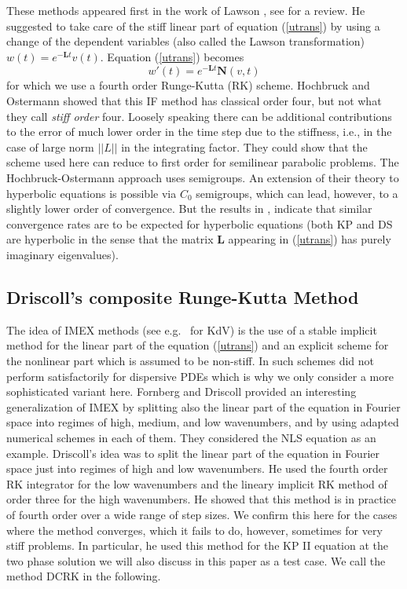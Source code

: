 \documentclass[final]{siamltex}
\begin{document}
These methods appeared first in the work of Lawson 
\cite{law}, see \cite{MW} for a review.
He suggested to take care of the stiff linear part of 
equation (\ref{utrans}) by
using a change of the dependent variables (also called the Lawson transformation)
$w(t)=e^{-\mathbf{L}t}v(t)$.
Equation (\ref{utrans}) becomes
\begin{equation}\label{e6}
w'(t)=e^{-\mathbf{L}t}\mathbf{N}(v,t)
\end{equation}
for which we use a fourth order Runge-Kutta (RK) scheme. Hochbruck and 
Ostermann \cite{HO} showed that this IF method has classical 
order four, but not what they call \emph{stiff order} four. Loosely 
speaking there can be additional contributions to the error of much 
lower order in the time step due to the stiffness, i.e., in the case 
of large norm $||L||$ in the integrating factor. They could show that 
the scheme used here can reduce to first order for semilinear parabolic 
problems. The Hochbruck-Ostermann approach uses 
semigroups. An extension of their theory to 
hyperbolic equations is possible via $C_{0}$ semigroups, which can 
lead, however, to a slightly lower order of convergence. But the results in 
\cite{BS}, \cite{ckkdvnls} indicate that similar convergence rates are to be 
expected for hyperbolic equations (both KP and DS are hyperbolic in 
the sense that the matrix $\mathbf{L}$ appearing in (\ref{utrans}) has purely 
imaginary eigenvalues).

\subsection{Driscoll's composite Runge-Kutta Method}
The idea of IMEX methods (see e.g.~\cite{CK} for KdV) is the use of a 
stable implicit method for the linear part of the equation 
(\ref{utrans}) and an explicit scheme for the nonlinear part which is 
assumed to be non-stiff. In \cite{KassT} such schemes did not 
perform satisfactorily for dispersive PDEs which is why we only 
consider a more sophisticated variant here. Fornberg and Driscoll 
\cite{Forn} provided an interesting generalization of IMEX by splitting 
also the linear part of the equation in Fourier space into regimes of high, 
medium, and low wavenumbers, and by using adapted numerical schemes in 
each of them. They considered the NLS equation as an example. 
Driscoll's \cite{D} idea  was to split the linear part of the equation in
Fourier space just into regimes of high and low wavenumbers. He
used the fourth order RK integrator for the low wavenumbers and the
lineary implicit RK method of order three for the high wavenumbers.
He showed that this method is in practice of fourth order over a wide range of step
sizes. We confirm this here for the cases where the method converges, 
which it fails to do, however, sometimes for very stiff problems.
In
particular, he used this method for the KP II equation at the two 
phase solution we will also discuss in this paper as a test case. We 
call the method DCRK in the following.
\end{document}
